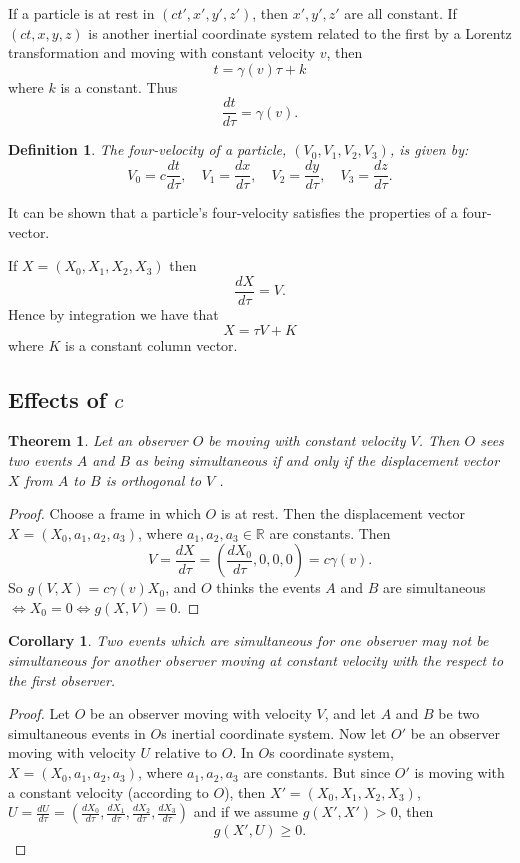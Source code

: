 \documentclass[12pt]{article}
\newtheorem{thm}{Theorem}
\newtheorem{cor}{Corollary}
\theoremstyle{defn}
\newtheorem{defn}{Definition}
\theoremstyle{pf}
\newcommand{\R}{\mathbb{R}}
\newcommand{\0}{\emptyset}
\renewcommand{\-}{\setminus}
\begin{document}
If a particle is at rest in $(ct',x',y',z')$, then $x',y',z'$ are all constant. If $(ct,x,y,z)$ is another inertial coordinate system related to the first by a Lorentz transformation and moving with constant velocity $v$,
 then
$$t=\gamma(v)\tau+k$$
where $k$ is a constant. Thus $$\dfrac{dt}{d\tau}=\gamma(v).$$

\begin{defn}The \textit{four-velocity} of a particle, $(V_0,V_1,V_2,V_3)$, is given by:
$$V_0=c\dfrac{dt}{d\tau}, \quad V_1=\dfrac{dx}{d\tau}, \quad V_2=\dfrac{dy}{d\tau}, \quad V_3=\dfrac{dz}{d\tau}.$$
\end{defn}

It can be shown that a particle's four-velocity satisfies the properties of a four-vector.

If $X=(X_0,X_1,X_2,X_3)$ then $$\dfrac{dX}{d\tau}=V.$$ Hence by integration we have that $$X=\tau V+K$$ where $K$ is a constant column vector.

\subsection{Effects of $c$}

\begin{thm}\label{orthog}Let an observer $O$ be moving with constant velocity $V$. Then $O$ sees two events $A$ and $B$ as being simultaneous if and only if the displacement vector $X$ from $A$ to $B$ is orthogonal to $V$ \cite{woodhouse}.
\end{thm}
\begin{proof}
 Choose a frame in which $O$ is at rest. Then the displacement vector $X=(X_0,a_1,a_2,a_3)$, where $a_1,a_2,a_3\in\R$ are constants. Then $$V=\dfrac{dX}{d\tau}=\left(\dfrac{dX_0}{d\tau},0,0,0\right)=c\gamma(v).$$ So $g(V,X)=c\gamma(v)X_0$, and $O$ thinks the events $A$ and $B$ are simultaneous $\iff X_0 = 0 \iff g(X,V)=0.$
\end{proof}

\begin{cor}Two events which are simultaneous for one observer may not be simultaneous for another observer moving at constant velocity with the respect to the first observer.
\end{cor}
\begin{proof}
 Let $O$ be an observer moving with velocity $V$, and let $A$ and $B$ be two simultaneous events in $O$s inertial coordinate system. Now let $O'$ be an observer moving with velocity $U$ relative to $O$. In $O$s coordinate system, $X=(X_0,a_1,a_2,a_3)$, where $a_1,a_2,a_3$ are constants. But since $O'$ is moving with a constant velocity (according to $O$), then $X'=(X_0,X_1,X_2,X_3)$, $U=\frac{dU}{d\tau}=(\frac{dX_0}{d\tau},\frac{dX_1}{d\tau},\frac{dX_2}{d\tau},\frac{dX_3}{d\tau})$ and if we assume $g(X',X')>0$, then $$g(X',U)\geq0.$$
\end{proof}
\end{document}
